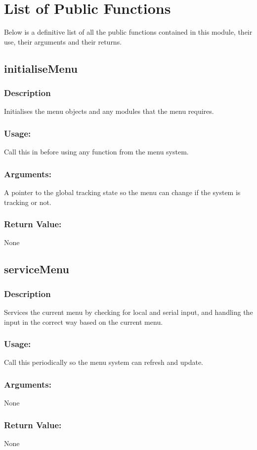 \documentclass[]{report}
\begin{document}
\section{List of Public Functions}
Below is a definitive list of all the public functions contained in this module, their use, their arguments and their returns.

\subsection{initialiseMenu}
\subsubsection{Description}
Initialises the menu objects and any modules that the menu requires. 
\subsubsection{Usage:}
Call this in before using any function from the menu system. 
\subsubsection{Arguments:}
A pointer to the global tracking state so the menu can change if the system is tracking or not.
\subsubsection{Return Value:}
None

\subsection{serviceMenu}
\subsubsection{Description}
Services the current menu by checking for local and serial input, and handling the input in the correct way based on the current menu.
\subsubsection{Usage:}
Call this periodically so the menu system can refresh and update. 
\subsubsection{Arguments:}
None
\subsubsection{Return Value:}
None
\end{document}
